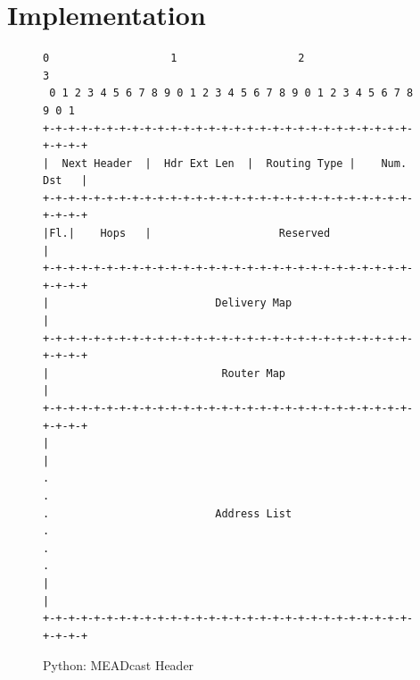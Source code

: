 \chapter{Implementation} %
\label{chap:Implementation}

\begin{figure}[h!]
\centering
\begin{lstlisting}[xleftmargin=.07\textwidth]
 0                   1                   2                   3
 0 1 2 3 4 5 6 7 8 9 0 1 2 3 4 5 6 7 8 9 0 1 2 3 4 5 6 7 8 9 0 1
+-+-+-+-+-+-+-+-+-+-+-+-+-+-+-+-+-+-+-+-+-+-+-+-+-+-+-+-+-+-+-+-+
|  Next Header  |  Hdr Ext Len  |  Routing Type |    Num. Dst   |
+-+-+-+-+-+-+-+-+-+-+-+-+-+-+-+-+-+-+-+-+-+-+-+-+-+-+-+-+-+-+-+-+
|Fl.|    Hops   |                    Reserved                   |
+-+-+-+-+-+-+-+-+-+-+-+-+-+-+-+-+-+-+-+-+-+-+-+-+-+-+-+-+-+-+-+-+
|                          Delivery Map                         |
+-+-+-+-+-+-+-+-+-+-+-+-+-+-+-+-+-+-+-+-+-+-+-+-+-+-+-+-+-+-+-+-+
|                           Router Map                          |
+-+-+-+-+-+-+-+-+-+-+-+-+-+-+-+-+-+-+-+-+-+-+-+-+-+-+-+-+-+-+-+-+
|                                                               |
.                                                               .
.                          Address List                         .
.                                                               .
|                                                               |
+-+-+-+-+-+-+-+-+-+-+-+-+-+-+-+-+-+-+-+-+-+-+-+-+-+-+-+-+-+-+-+-+
\end{lstlisting}
\caption{Python: MEADcast Header}
\end{figure}

